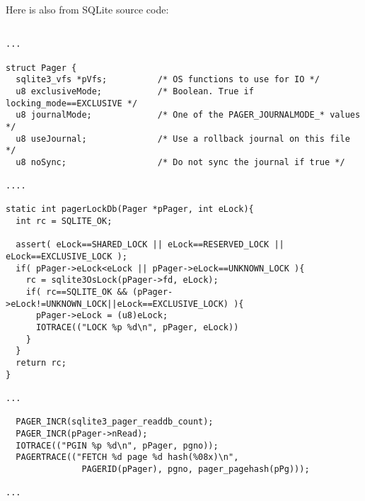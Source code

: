 Here is also from SQLite source code:

\begin{lstlisting}

...

struct Pager {
  sqlite3_vfs *pVfs;          /* OS functions to use for IO */
  u8 exclusiveMode;           /* Boolean. True if locking_mode==EXCLUSIVE */
  u8 journalMode;             /* One of the PAGER_JOURNALMODE_* values */
  u8 useJournal;              /* Use a rollback journal on this file */
  u8 noSync;                  /* Do not sync the journal if true */

....

static int pagerLockDb(Pager *pPager, int eLock){
  int rc = SQLITE_OK;

  assert( eLock==SHARED_LOCK || eLock==RESERVED_LOCK || eLock==EXCLUSIVE_LOCK );
  if( pPager->eLock<eLock || pPager->eLock==UNKNOWN_LOCK ){
    rc = sqlite3OsLock(pPager->fd, eLock);
    if( rc==SQLITE_OK && (pPager->eLock!=UNKNOWN_LOCK||eLock==EXCLUSIVE_LOCK) ){
      pPager->eLock = (u8)eLock;
      IOTRACE(("LOCK %p %d\n", pPager, eLock))
    }
  }
  return rc;
}

...

  PAGER_INCR(sqlite3_pager_readdb_count);
  PAGER_INCR(pPager->nRead);
  IOTRACE(("PGIN %p %d\n", pPager, pgno));
  PAGERTRACE(("FETCH %d page %d hash(%08x)\n",
               PAGERID(pPager), pgno, pager_pagehash(pPg)));

...

\end{lstlisting}


